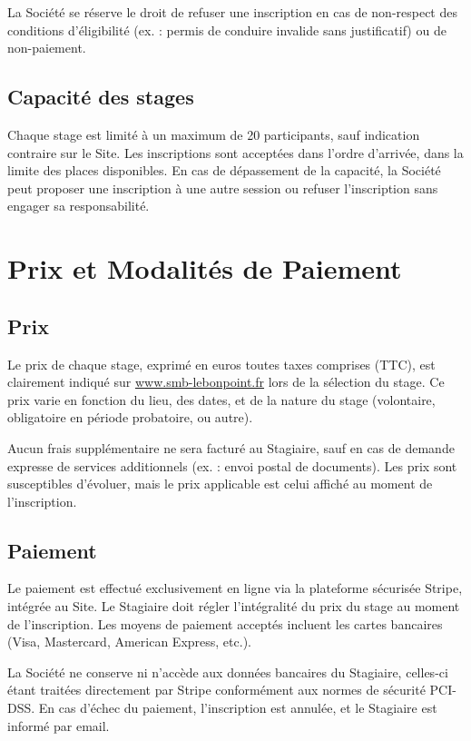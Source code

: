 \documentclass[a4paper,12pt]{article}
\begin{document}
La Société se réserve le droit de refuser une inscription en cas de non-respect des conditions d'éligibilité (ex. : permis de conduire invalide sans justificatif) ou de non-paiement.

\subsection{Capacité des stages}
Chaque stage est limité à un maximum de 20 participants, sauf indication contraire sur le Site. Les inscriptions sont acceptées dans l'ordre d'arrivée, dans la limite des places disponibles. En cas de dépassement de la capacité, la Société peut proposer une inscription à une autre session ou refuser l'inscription sans engager sa responsabilité.

\section{Prix et Modalités de Paiement}
\subsection{Prix}
Le prix de chaque stage, exprimé en euros toutes taxes comprises (TTC), est clairement indiqué sur \href{https://www.smb-lebonpoint.fr}{www.smb-lebonpoint.fr} lors de la sélection du stage. Ce prix varie en fonction du lieu, des dates, et de la nature du stage (volontaire, obligatoire en période probatoire, ou autre). 

Aucun frais supplémentaire ne sera facturé au Stagiaire, sauf en cas de demande expresse de services additionnels (ex. : envoi postal de documents). Les prix sont susceptibles d'évoluer, mais le prix applicable est celui affiché au moment de l'inscription.

\subsection{Paiement}
Le paiement est effectué exclusivement en ligne via la plateforme sécurisée Stripe, intégrée au Site. Le Stagiaire doit régler l'intégralité du prix du stage au moment de l'inscription. Les moyens de paiement acceptés incluent les cartes bancaires (Visa, Mastercard, American Express, etc.). 

La Société ne conserve ni n'accède aux données bancaires du Stagiaire, celles-ci étant traitées directement par Stripe conformément aux normes de sécurité PCI-DSS. En cas d'échec du paiement, l'inscription est annulée, et le Stagiaire est informé par email.
\end{document}
